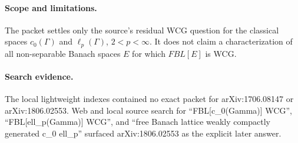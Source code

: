 \documentclass[11pt]{article}
\begin{document}
\paragraph{Scope and limitations.}
The packet settles only the source's residual WCG question for the classical spaces \(c_0(\Gamma)\) and \(\ell_p(\Gamma)\), \(2<p<\infty\).  It does not claim a characterization of all non-separable Banach spaces \(E\) for which \(FBL[E]\) is WCG.

\paragraph{Search evidence.}
The local lightweight indexes contained no exact packet for arXiv:1706.08147 or arXiv:1806.02553.  Web and local source search for ``FBL[c\_0(Gamma)] WCG'', ``FBL[ell\_p(Gamma)] WCG'', and ``free Banach lattice weakly compactly generated c\_0 ell\_p'' surfaced arXiv:1806.02553 as the explicit later answer.
\end{document}

